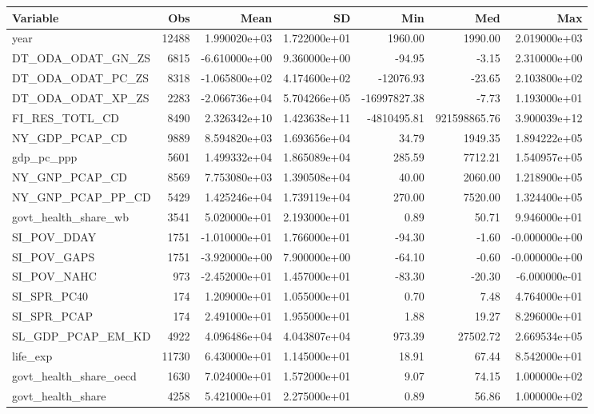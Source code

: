 \begin{tabular}{lrrrrrr}
\toprule
              Variable &   Obs &          Mean &           SD &          Min &          Med &           Max \\
\midrule
year & 12488 & 1.990020e+03 & 1.722000e+01 & 1960.00 & 1990.00 & 2.019000e+03 \\
DT\_ODA\_ODAT\_GN\_ZS & 6815 & -6.610000e+00 & 9.360000e+00 & -94.95 & -3.15 & 2.310000e+00 \\
DT\_ODA\_ODAT\_PC\_ZS & 8318 & -1.065800e+02 & 4.174600e+02 & -12076.93 & -23.65 & 2.103800e+02 \\
DT\_ODA\_ODAT\_XP\_ZS & 2283 & -2.066736e+04 & 5.704266e+05 & -16997827.38 & -7.73 & 1.193000e+01 \\
FI\_RES\_TOTL\_CD & 8490 & 2.326342e+10 & 1.423638e+11 & -4810495.81 & 921598865.76 & 3.900039e+12 \\
NY\_GDP\_PCAP\_CD & 9889 & 8.594820e+03 & 1.693656e+04 & 34.79 & 1949.35 & 1.894222e+05 \\
gdp\_pc\_ppp & 5601 & 1.499332e+04 & 1.865089e+04 & 285.59 & 7712.21 & 1.540957e+05 \\
NY\_GNP\_PCAP\_CD & 8569 & 7.753080e+03 & 1.390508e+04 & 40.00 & 2060.00 & 1.218900e+05 \\
NY\_GNP\_PCAP\_PP\_CD & 5429 & 1.425246e+04 & 1.739119e+04 & 270.00 & 7520.00 & 1.324400e+05 \\
govt\_health\_share\_wb & 3541 & 5.020000e+01 & 2.193000e+01 & 0.89 & 50.71 & 9.946000e+01 \\
SI\_POV\_DDAY & 1751 & -1.010000e+01 & 1.766000e+01 & -94.30 & -1.60 & -0.000000e+00 \\
SI\_POV\_GAPS & 1751 & -3.920000e+00 & 7.900000e+00 & -64.10 & -0.60 & -0.000000e+00 \\
SI\_POV\_NAHC & 973 & -2.452000e+01 & 1.457000e+01 & -83.30 & -20.30 & -6.000000e-01 \\
SI\_SPR\_PC40 & 174 & 1.209000e+01 & 1.055000e+01 & 0.70 & 7.48 & 4.764000e+01 \\
SI\_SPR\_PCAP & 174 & 2.491000e+01 & 1.955000e+01 & 1.88 & 19.27 & 8.296000e+01 \\
SL\_GDP\_PCAP\_EM\_KD & 4922 & 4.096486e+04 & 4.043807e+04 & 973.39 & 27502.72 & 2.669534e+05 \\
life\_exp & 11730 & 6.430000e+01 & 1.145000e+01 & 18.91 & 67.44 & 8.542000e+01 \\
govt\_health\_share\_oecd & 1630 & 7.024000e+01 & 1.572000e+01 & 9.07 & 74.15 & 1.000000e+02 \\
govt\_health\_share & 4258 & 5.421000e+01 & 2.275000e+01 & 0.89 & 56.86 & 1.000000e+02 \\
\bottomrule
\end{tabular}
